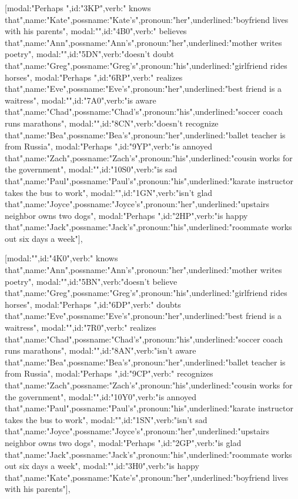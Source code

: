 [{modal:"Perhaps ",id:"3KP",verb:" knows that",name:"Kate",possname:"Kate's",pronoun:"her",underlined:"boyfriend lives with his parents"},
{modal:"",id:"4B0",verb:" believes that",name:"Ann",possname:"Ann's",pronoun:"her",underlined:"mother writes poetry"},
{modal:"",id:"5DN",verb:"doesn't doubt that",name:"Greg",possname:"Greg's",pronoun:"his",underlined:"girlfriend rides horses"},
{modal:"Perhaps ",id:"6RP",verb:" realizes that",name:"Eve",possname:"Eve's",pronoun:"her",underlined:"best friend is a waitress"},
{modal:"",id:"7A0",verb:"is aware that",name:"Chad",possname:"Chad's",pronoun:"his",underlined:"soccer coach runs marathons"},
{modal:"",id:"8CN",verb:"doesn't recognize that",name:"Bea",possname:"Bea's",pronoun:"her",underlined:"ballet teacher is from Russia"},
{modal:"Perhaps ",id:"9YP",verb:"is annoyed that",name:"Zach",possname:"Zach's",pronoun:"his",underlined:"cousin works for the government"},
{modal:"",id:"10S0",verb:"is sad that",name:"Paul",possname:"Paul's",pronoun:"his",underlined:"karate instructor takes the bus to work"},
{modal:"",id:"1GN",verb:"isn't glad that",name:"Joyce",possname:"Joyce's",pronoun:"her",underlined:"upstairs neighbor owns two dogs"},
{modal:"Perhaps ",id:"2HP",verb:"is happy that",name:"Jack",possname:"Jack's",pronoun:"his",underlined:"roommate works out six days a week"}],

[{modal:"",id:"4K0",verb:" knows that",name:"Ann",possname:"Ann's",pronoun:"her",underlined:"mother writes poetry"},
{modal:"",id:"5BN",verb:"doesn't believe that",name:"Greg",possname:"Greg's",pronoun:"his",underlined:"girlfriend rides horses"},
{modal:"Perhaps ",id:"6DP",verb:" doubts that",name:"Eve",possname:"Eve's",pronoun:"her",underlined:"best friend is a waitress"},
{modal:"",id:"7R0",verb:" realizes that",name:"Chad",possname:"Chad's",pronoun:"his",underlined:"soccer coach runs marathons"},
{modal:"",id:"8AN",verb:"isn't aware that",name:"Bea",possname:"Bea's",pronoun:"her",underlined:"ballet teacher is from Russia"},
{modal:"Perhaps ",id:"9CP",verb:" recognizes that",name:"Zach",possname:"Zach's",pronoun:"his",underlined:"cousin works for the government"},
{modal:"",id:"10Y0",verb:"is annoyed that",name:"Paul",possname:"Paul's",pronoun:"his",underlined:"karate instructor takes the bus to work"},
{modal:"",id:"1SN",verb:"isn't sad that",name:"Joyce",possname:"Joyce's",pronoun:"her",underlined:"upstairs neighbor owns two dogs"},
{modal:"Perhaps ",id:"2GP",verb:"is glad that",name:"Jack",possname:"Jack's",pronoun:"his",underlined:"roommate works out six days a week"},
{modal:"",id:"3H0",verb:"is happy that",name:"Kate",possname:"Kate's",pronoun:"her",underlined:"boyfriend lives with his parents"}],

